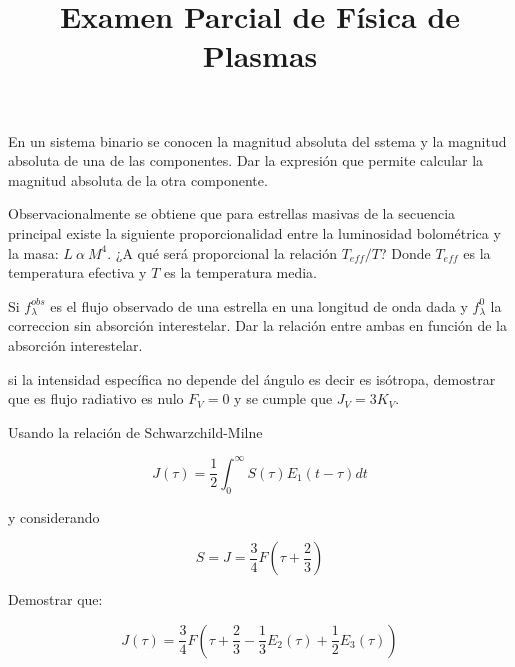 \documentclass[12pt,spanish,a4paper]{practice}
\begin{document}
    \title{Examen Parcial de Física de Plasmas}
    \maketitle

    \begin{problem}
        En un sistema binario se conocen la magnitud absoluta del sstema y la magnitud absoluta de una de las componentes. Dar la expresión que permite calcular la magnitud absoluta de la otra componente.
    \end{problem}

    \begin{problem}
        Observacionalmente se obtiene que para estrellas masivas de la secuencia principal existe la siguiente proporcionalidad entre la luminosidad bolométrica y la masa: $L\ \alpha\ M^{4}$. ¿A qué será proporcional la relación $T_{eff}/T$? Donde $T_{eff}$ es la temperatura efectiva y $T$ es la temperatura media.
    \end{problem}

    \begin{problem}
        Si $f_{\lambda}^{obs}$ es el flujo observado de una estrella en una longitud de onda dada y $f_{\lambda}^{0}$ la correccion sin absorción interestelar. Dar la relación entre ambas en función de la absorción interestelar.
    \end{problem}
    
    \begin{problem}
        si la intensidad específica no depende del ángulo es decir es isótropa, demostrar que es flujo radiativo es nulo $F_{V}=0$ y se cumple que $J_{V}=3K_{V}$.
    \end{problem}

    \begin{problem}
       Usando la relación de Schwarzchild-Milne
   
            $$
                J(\tau) = \frac{1}{2} \displaystyle{\int_{0}^{\infty}} S(\tau) E_{1} (t-\tau) dt
            $$

        y considerando

            $$
                S=J= \frac{3}{4} F\left(\tau+\frac{2}{3}\right)
            $$
        
        Demostrar que:

            $$
                J(\tau) = \frac{3}{4}F\left(\tau+\frac{2}{3}-\frac{1}{3}E_{2}(\tau)+\frac{1}{2}E_{3}(\tau)\right)
            $$
    \end{problem}
\end{document}
